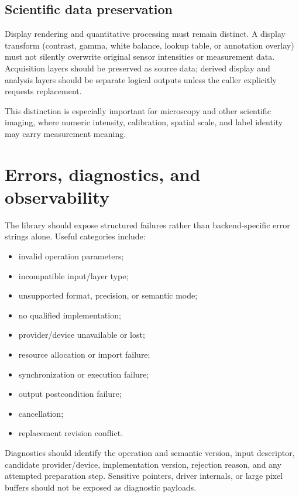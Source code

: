 \documentclass[11pt,a4paper,oneside]{article}
\begin{document}
\subsection{Scientific data preservation}

Display rendering and quantitative processing must remain distinct. A display transform (contrast, gamma, white balance, lookup table, or annotation overlay) must not silently overwrite original sensor intensities or measurement data. Acquisition layers should be preserved as source data; derived display and analysis layers should be separate logical outputs unless the caller explicitly requests replacement.

This distinction is especially important for microscopy and other scientific imaging, where numeric intensity, calibration, spatial scale, and label identity may carry measurement meaning.

\section{Errors, diagnostics, and observability}

The library should expose structured failures rather than backend-specific error strings alone. Useful categories include:
\begin{itemize}
  \item invalid operation parameters;
  \item incompatible input/layer type;
  \item unsupported format, precision, or semantic mode;
  \item no qualified implementation;
  \item provider/device unavailable or lost;
  \item resource allocation or import failure;
  \item synchronization or execution failure;
  \item output postcondition failure;
  \item cancellation;
  \item replacement revision conflict.
\end{itemize}

Diagnostics should identify the operation and semantic version, input descriptor, candidate provider/device, implementation version, rejection reason, and any attempted preparation step. Sensitive pointers, driver internals, or large pixel buffers should not be exposed as diagnostic payloads.
\end{document}
